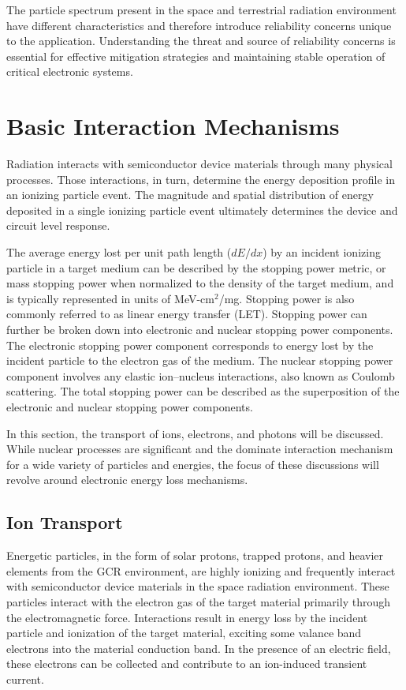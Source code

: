 The particle spectrum present in the space and terrestrial radiation environment have different characteristics and therefore introduce reliability concerns unique to the application.
Understanding the threat and source of reliability concerns is essential for effective mitigation strategies and maintaining stable operation of critical electronic systems.

\section{Basic Interaction Mechanisms} %
\label{sec:basic_interaction_mechanisms}
Radiation interacts with semiconductor device materials through many physical processes.
Those interactions, in turn, determine the energy deposition profile in an ionizing particle event.
The magnitude and spatial distribution of energy deposited in a single ionizing particle event ultimately determines the device and circuit level response.

The average energy lost per unit path length ($dE/dx$) by an incident ionizing particle in a target medium can be described by the stopping power metric, or mass stopping power when normalized to the density of the target medium, and is typically represented in units of MeV-cm$^2$/mg.
Stopping power is also commonly referred to as linear energy transfer (LET).
Stopping power can further be broken down into electronic and nuclear stopping power components.
The electronic stopping power component corresponds to energy lost by the incident particle to the electron gas of the medium.
The nuclear stopping power component involves any elastic ion--nucleus interactions, also known as Coulomb scattering.
The total stopping power can be described as the superposition of the electronic and nuclear stopping power components.

In this section, the transport of ions, electrons, and photons will be discussed.
While nuclear processes are significant and the dominate interaction mechanism for a wide variety of particles and energies, the focus of these discussions will revolve around electronic energy loss mechanisms.

\subsection{Ion Transport} %
\label{sub:ion_transport}
Energetic particles, in the form of solar protons, trapped protons, and heavier elements from the GCR environment, are highly ionizing and frequently interact with semiconductor device materials in the space radiation environment.
These particles interact with the electron gas of the target material primarily through the electromagnetic force.
Interactions result in energy loss by the incident particle and ionization of the target material, exciting some valance band electrons into the material conduction band.
In the presence of an electric field, these electrons can be collected and contribute to an ion-induced transient current.

